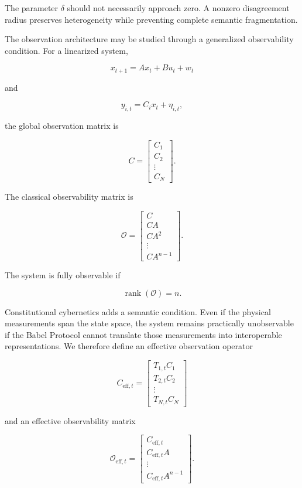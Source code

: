 \documentclass[12pt,a4paper]{article}
\DeclareMathOperator{\rank}{rank}
\begin{document}
The parameter \(\delta\) should not necessarily approach zero. A nonzero disagreement radius preserves heterogeneity while preventing complete semantic fragmentation.

The observation architecture may be studied through a generalized observability condition. For a linearized system,

\[
x_{t+1}=Ax_t+Bu_t+w_t
\]

and

\[
y_{i,t}=C_i x_t+\eta_{i,t},
\]

the global observation matrix is

\[
C
=
\begin{bmatrix}
C_1\\
C_2\\
\vdots\\
C_N
\end{bmatrix}.
\]

The classical observability matrix is

\[
\mathcal{O}
=
\begin{bmatrix}
C\\
CA\\
CA^2\\
\vdots\\
CA^{n-1}
\end{bmatrix}.
\]

The system is fully observable if

\[
\rank(\mathcal{O})=n.
\]

Constitutional cybernetics adds a semantic condition. Even if the physical measurements span the state space, the system remains practically unobservable if the Babel Protocol cannot translate those measurements into interoperable representations. We therefore define an effective observation operator

\[
C_{\mathrm{eff},t}
=
\begin{bmatrix}
T_{1,t}C_1\\
T_{2,t}C_2\\
\vdots\\
T_{N,t}C_N
\end{bmatrix}
\]

and an effective observability matrix

\[
\mathcal{O}_{\mathrm{eff},t}
=
\begin{bmatrix}
C_{\mathrm{eff},t}\\
C_{\mathrm{eff},t}A\\
\vdots\\
C_{\mathrm{eff},t}A^{n-1}
\end{bmatrix}.
\]
\end{document}
